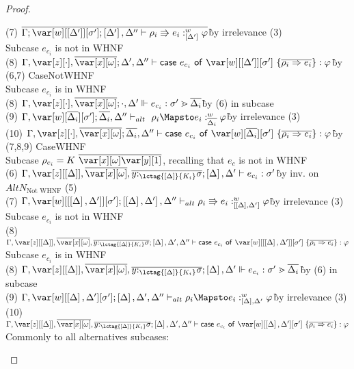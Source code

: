 \begin{proof}
\begin{tabbing}
    (7) $\ov{\G; \var[w][\irr{\D'}][\s']; \irr{\D'}, \D'' \vdash \rho_i \Rrightarrow e_i :^w_{\irr{\D'}} \vp}$\`by irrelevance (3)\\
    Subcase $e_{c_i}$ is not in WHNF\\
    (8) $\G,\z[\cdot],\ov{\xo}; \D',\D'' \vdash \ccase{e_{c_i}}{\var[w][\irr{\D'}][\s']~\{\ov{\rho_i \Rightarrow e_i}\}} : \vp$\`by (6,7) CaseNotWHNF\\
    Subcase $e_{c_i}$ is in WHNF\\
    (8) $\G,\z[\cdot], \ov{\xo} ; \cdot, \D' \Vdash e_{c_i} : \s' \gtrdot \ov{\D_i}$\`by (6) in subcase\\
    (9) $\G, \var[w][\ov{\D_i}][\s']; \ov{\D_i}, \D'' \vdash_{alt} \rho_i \Mapsto e_i :^w_{\ov{\D_i}} \vp$\`by irrelevance (3)\\
    (10) $\G,\z[\cdot],\ov{\xo}; \ov{\D_i},\D'' \vdash \ccase{e_{c_i}}{\var[w][\ov{\D_i}][\s']~\{\ov{\rho_i \Rightarrow e_i}\}} : \vp$\`by (7,8,9) CaseWHNF\\
    Subcase $\rho_{c_i} = K~\ov{\xo}\ov{\y[1]}$, recalling that $e_c$ is not in WHNF\\
    (6) $\G,\z[\irr{\D}], \ov{\xo}, \ov{y{:}_{\lctag{\irr{\D}}{K_i}}\s}; \irr{\D},\D' \vdash e_{c_i} : \s'$\`by inv. on $AltN_\textrm{Not WHNF}$ (5)\\
    (7) $\G,\var[w][\irr{\irr{\D},\D'}][\s']; \irr{\irr{\D}, \D'}, \D'' \vdash_{alt} \rho_i \Rrightarrow e_i :^w_{\irr{\irr{\D},\D'}} \vp$\`by irrelevance (3)\\
    Subcase $e_{c_i}$ is not in WHNF\\
    (8) $\G,\z[\irr{\D}], \ov{\xo}, \ov{y{:}_{\lctag{\irr{\D}}{K_i}}\s}; \irr{\D},\D',\D'' \vdash \ccase{e_{c_i}}{\var[w][\irr{\irr{\D},\D'}][\s']~\{\ov{\rho_i \Rightarrow e_i}\}} : \vp$\\
    Subcase $e_{c_i}$ is in WHNF\\
    (8) $\G,\z[\irr{\D}], \ov{\xo}, \ov{y{:}_{\lctag{\irr{\D}}{K_i}}\s}; \irr{\D},\D' \Vdash e_{c_i} : \s' \gtrdot \ov{\D_i}$\`by (6) in subcase\\
    (9) $\G,\var[w][\irr{\D},\D'][\s']; \irr{\D}, \D', \D'' \vdash_{alt} \rho_i \Mapsto e_i :^w_{\irr{\D},\D'} \vp$\`by irrelevance (3)\\
    (10) $\G,\z[\irr{\D}], \ov{\xo}, \ov{y{:}_{\lctag{\irr{\D}}{K_i}}\s}; \irr{\D},\D',\D'' \vdash \ccase{e_{c_i}}{\var[w][\irr{\D},\D'][\s']~\{\ov{\rho_i \Rightarrow e_i}\}} : \vp$\\
    Commonly to all alternatives subcases:\\

\end{tabbing}
\end{proof}
